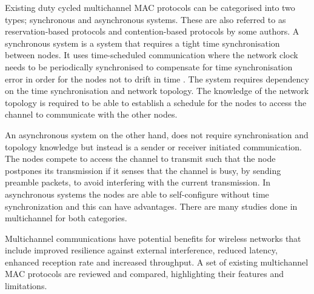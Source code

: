 
Existing duty cycled multichannel MAC protocols can be categorised into two types; synchronous and asynchronous systems. These are also referred to as reservation-based protocols and contention-based protocols by some authors. A synchronous system is a system that requires a tight time synchronisation between nodes. It uses time-scheduled communication where the network clock needs to be periodically synchronised to compensate for time synchronisation error in order for the nodes not to drift in time \cite{y-mac}. The system requires dependency on the time synchronisation and network topology. The knowledge of the network topology is required to be able to establish a schedule for the nodes to access the channel to communicate with the other nodes.


An asynchronous system on the other hand, does not require synchronisation and topology knowledge but instead is a sender or receiver initiated communication. The nodes compete to access the channel to transmit such that the node postpones its transmission if it senses that the channel is busy, by sending preamble packets, to avoid interfering with the current transmission. In asynchronous systems the nodes are able to self-configure without time synchronization and this can have advantages. There are many studies done in multichannel for both categories.

Multichannel communications have potential benefits for wireless networks that include improved resilience against external interference, reduced latency, enhanced reception rate and increased throughput. A set of existing multichannel MAC protocols are reviewed and compared, highlighting their features and limitations.

